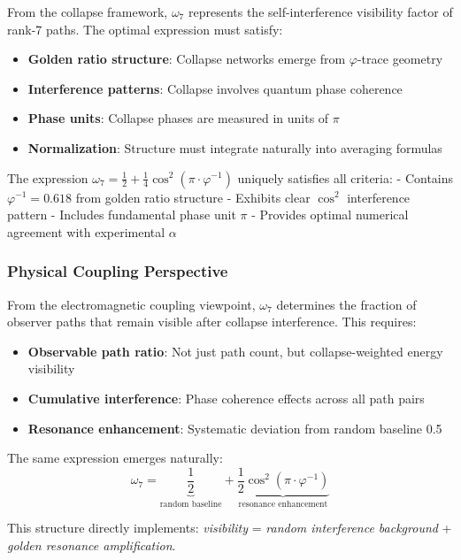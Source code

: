 \documentclass[%
 reprint,
 amsmath,amssymb,
 aps,
 prd,
 10pt,
 nofootinbib,      %
 longbibliography  %
]{revtex4-2}
\theoremstyle{definition}
\theoremstyle{remark}
\begin{document}
From the collapse framework, $\omega_7$ represents the self-interference visibility factor of rank-7 paths. The optimal expression must satisfy:

\begin{itemize}
\item \textbf{Golden ratio structure}: Collapse networks emerge from $\varphi$-trace geometry
\item \textbf{Interference patterns}: Collapse involves quantum phase coherence
\item \textbf{Phase units}: Collapse phases are measured in units of $\pi$
\item \textbf{Normalization}: Structure must integrate naturally into averaging formulas
\end{itemize}

The expression $\omega_7 = \frac{1}{2} + \frac{1}{4}\cos^2(\pi \cdot \varphi^{-1})$ uniquely satisfies all criteria:
- Contains $\varphi^{-1} = 0.618$ from golden ratio structure
- Exhibits clear $\cos^2$ interference pattern
- Includes fundamental phase unit $\pi$
- Provides optimal numerical agreement with experimental $\alpha$

\subsubsection{Physical Coupling Perspective}

From the electromagnetic coupling viewpoint, $\omega_7$ determines the fraction of observer paths that remain visible after collapse interference. This requires:

\begin{itemize}
\item \textbf{Observable path ratio}: Not just path count, but collapse-weighted energy visibility
\item \textbf{Cumulative interference}: Phase coherence effects across all path pairs
\item \textbf{Resonance enhancement}: Systematic deviation from random baseline 0.5
\end{itemize}

The same expression emerges naturally:
\begin{equation}
\omega_7 = \underbrace{\frac{1}{2}}_{\text{random baseline}} + \underbrace{\frac{1}{2} \cos^2(\pi \cdot \varphi^{-1})}_{\text{resonance enhancement}}
\end{equation}

This structure directly implements: \textit{visibility} = \textit{random interference background} + \textit{golden resonance amplification}.
\end{document}

